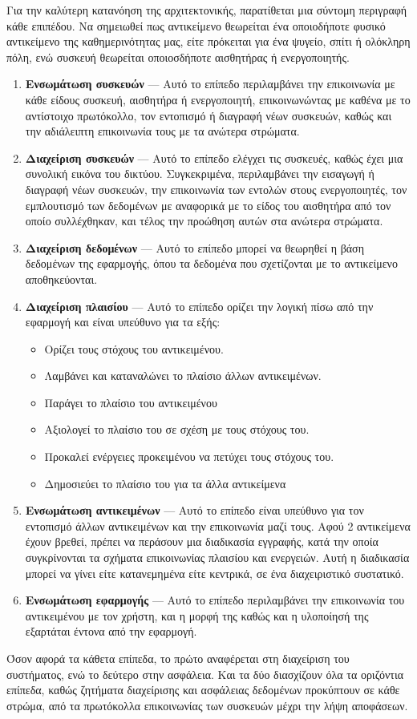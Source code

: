 Για την καλύτερη κατανόηση της αρχιτεκτονικής, παρατίθεται μια σύντομη περιγραφή κάθε επιπέδου. Να σημειωθεί πως αντικείμενο θεωρείται ένα οποιοδήποτε φυσικό αντικείμενο της καθημερινότητας μας, είτε πρόκειται για ένα ψυγείο, σπίτι ή ολόκληρη πόλη, ενώ συσκευή θεωρείται οποιοσδήποτε αισθητήρας ή ενεργοποιητής.
\begin{enumerate}
    \item \textbf{Ενσωμάτωση συσκευών} --- Αυτό το επίπεδο περιλαμβάνει την επικοινωνία με κάθε είδους συσκευή, αισθητήρα ή ενεργοποιητή, επικοινωνώντας με καθένα με το αντίστοιχο πρωτόκολλο, τον εντοπισμό ή διαγραφή νέων συσκευών, καθώς και την αδιάλειπτη επικοινωνία τους με τα ανώτερα στρώματα.
    \item \textbf{Διαχείριση συσκευών} --- Αυτό το επίπεδο ελέγχει τις συσκευές, καθώς έχει μια συνολική εικόνα του δικτύου. Συγκεκριμένα, περιλαμβάνει την εισαγωγή ή διαγραφή νέων συσκευών, την επικοινωνία των εντολών στους ενεργοποιητές, τον εμπλουτισμό των δεδομένων με  αναφορικά με το είδος του αισθητήρα από τον οποίο συλλέχθηκαν, και τέλος την προώθηση αυτών στα ανώτερα στρώματα.
    \item \textbf{Διαχείριση δεδομένων} --- Αυτό το επίπεδο μπορεί να θεωρηθεί η βάση δεδομένων της εφαρμογής, όπου τα δεδομένα που σχετίζονται με το αντικείμενο αποθηκεύονται.
    \item \textbf{Διαχείριση πλαισίου} --- Αυτό το επίπεδο ορίζει την λογική πίσω από την εφαρμογή και είναι υπεύθυνο για τα εξής:
        \begin{itemize}
            \item Ορίζει τους στόχους του αντικειμένου.
            \item Λαμβάνει και καταναλώνει το πλαίσιο άλλων αντικειμένων.
            \item Παράγει το πλαίσιο του αντικειμένου
            \item Αξιολογεί το πλαίσιο του σε σχέση με τους στόχους του.
            \item Προκαλεί ενέργειες προκειμένου να πετύχει τους στόχους του.
            \item Δημοσιεύει το πλαίσιο του για τα άλλα αντικείμενα
        \end{itemize}
    \item \textbf{Ενσωμάτωση αντικειμένων} --- Αυτό το επίπεδο είναι υπεύθυνο για τον εντοπισμό άλλων αντικειμένων και την επικοινωνία μαζί τους. Αφού 2 αντικείμενα έχουν βρεθεί, πρέπει να περάσουν μια διαδικασία εγγραφής, κατά την οποία συγκρίνονται τα σχήματα επικοινωνίας πλαισίου και ενεργειών. Αυτή η διαδικασία μπορεί να γίνει είτε κατανεμημένα είτε κεντρικά, σε ένα διαχειριστικό συστατικό. 
    \item \textbf{Ενσωμάτωση εφαρμογής} --- Αυτό το επίπεδο περιλαμβάνει την επικοινωνία του αντικειμένου με τον χρήστη, και η μορφή της καθώς και η υλοποίησή της εξαρτάται έντονα από την εφαρμογή.
\end{enumerate}
Όσον αφορά τα κάθετα επίπεδα, το πρώτο αναφέρεται στη διαχείριση του συστήματος, ενώ το δεύτερο στην ασφάλεια. Και τα δύο διασχίζουν όλα τα οριζόντια επίπεδα, καθώς ζητήματα διαχείρισης και ασφάλειας δεδομένων προκύπτουν σε κάθε στρώμα, από τα πρωτόκολλα επικοινωνίας των συσκευών μέχρι την λήψη αποφάσεων.

